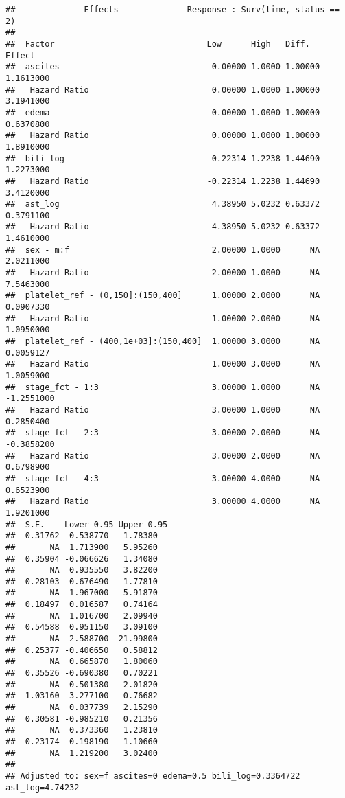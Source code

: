 \documentclass[]{book}
\theoremstyle{definition}
\theoremstyle{definition}
\theoremstyle{definition}
\theoremstyle{remark}
\begin{document}
\begin{verbatim}
##              Effects              Response : Surv(time, status == 2) 
## 
##  Factor                               Low      High   Diff.   Effect    
##  ascites                               0.00000 1.0000 1.00000  1.1613000
##   Hazard Ratio                         0.00000 1.0000 1.00000  3.1941000
##  edema                                 0.00000 1.0000 1.00000  0.6370800
##   Hazard Ratio                         0.00000 1.0000 1.00000  1.8910000
##  bili_log                             -0.22314 1.2238 1.44690  1.2273000
##   Hazard Ratio                        -0.22314 1.2238 1.44690  3.4120000
##  ast_log                               4.38950 5.0232 0.63372  0.3791100
##   Hazard Ratio                         4.38950 5.0232 0.63372  1.4610000
##  sex - m:f                             2.00000 1.0000      NA  2.0211000
##   Hazard Ratio                         2.00000 1.0000      NA  7.5463000
##  platelet_ref - (0,150]:(150,400]      1.00000 2.0000      NA  0.0907330
##   Hazard Ratio                         1.00000 2.0000      NA  1.0950000
##  platelet_ref - (400,1e+03]:(150,400]  1.00000 3.0000      NA  0.0059127
##   Hazard Ratio                         1.00000 3.0000      NA  1.0059000
##  stage_fct - 1:3                       3.00000 1.0000      NA -1.2551000
##   Hazard Ratio                         3.00000 1.0000      NA  0.2850400
##  stage_fct - 2:3                       3.00000 2.0000      NA -0.3858200
##   Hazard Ratio                         3.00000 2.0000      NA  0.6798900
##  stage_fct - 4:3                       3.00000 4.0000      NA  0.6523900
##   Hazard Ratio                         3.00000 4.0000      NA  1.9201000
##  S.E.    Lower 0.95 Upper 0.95
##  0.31762  0.538770   1.78380  
##       NA  1.713900   5.95260  
##  0.35904 -0.066626   1.34080  
##       NA  0.935550   3.82200  
##  0.28103  0.676490   1.77810  
##       NA  1.967000   5.91870  
##  0.18497  0.016587   0.74164  
##       NA  1.016700   2.09940  
##  0.54588  0.951150   3.09100  
##       NA  2.588700  21.99800  
##  0.25377 -0.406650   0.58812  
##       NA  0.665870   1.80060  
##  0.35526 -0.690380   0.70221  
##       NA  0.501380   2.01820  
##  1.03160 -3.277100   0.76682  
##       NA  0.037739   2.15290  
##  0.30581 -0.985210   0.21356  
##       NA  0.373360   1.23810  
##  0.23174  0.198190   1.10660  
##       NA  1.219200   3.02400  
## 
## Adjusted to: sex=f ascites=0 edema=0.5 bili_log=0.3364722 ast_log=4.74232
\end{verbatim}
\end{document}
